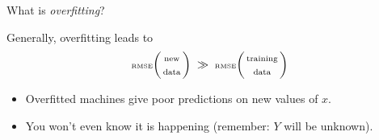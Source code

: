 \begin{frame}{\Large What is \textit{overfitting}?}
\begin{multicols}{2}
\begin{flushright}
\begin{minipage}{5.0cm}


	\vskip 0.3cm
	\pause\pause\pause\pause
	Generally, {\color{red}overfitting leads to
	\vskip -0.5cm
	\begin{equation*}
	\textnormal{\tiny RMSE}\!\left(\!\!\begin{array}{c}
		\textnormal{\scriptsize new} \\ \textnormal{\scriptsize data}
		\end{array}\!\!\right)
	\;\gg\;
	\textnormal{\tiny RMSE}\!\left(\!\!\begin{array}{c}
		\textnormal{\scriptsize training} \\ \textnormal{\scriptsize data}
		\end{array}\!\!\right)
	\end{equation*}
	}

	\begin{itemize}
	\item
		\pause
		Overfitted machines give poor predictions on new values of $x$.
	\item
		\pause
		You won't even know it is happening (remember: $Y$ will be unknown).
	\end{itemize}

	\end{minipage}
	\end{flushright}

\end{multicols}

\end{frame}
\normalsize

